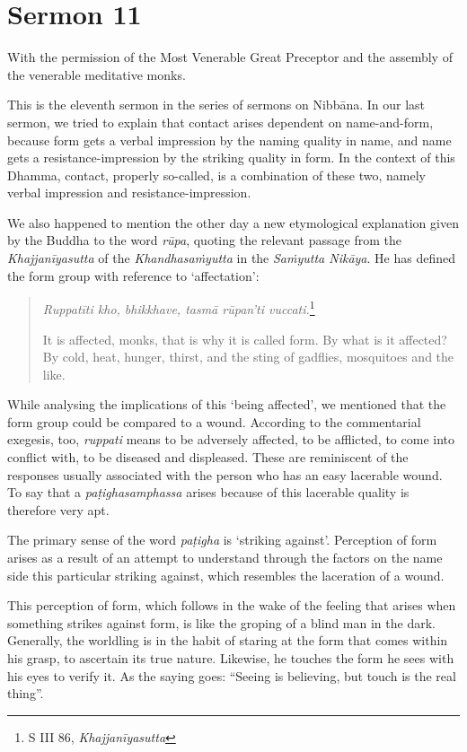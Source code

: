 \chapter{Sermon 11}

\NibbanaOpeningQuote

With the permission of the Most Venerable Great Preceptor and the assembly of the venerable meditative monks.

This is the eleventh sermon in the series of sermons on Nibbāna. In our last sermon, we tried to explain that contact arises dependent on name-and-form, because form gets a verbal impression by the naming quality in name, and name gets a resistance-impression by the striking quality in form. In the context of this Dhamma, contact, properly so-called, is a combination of these two, namely verbal impression and resistance-impression.

We also happened to mention the other day a new etymological explanation given by the Buddha to the word \emph{rūpa}, quoting the relevant passage from the \emph{Khajjanīyasutta} of the \emph{Khandhasaṁyutta} in the \emph{Saṁyutta Nikāya}. He has defined the form group with reference to `affectation':

\begin{quote}
\emph{Ruppatīti kho, bhikkhave, tasmā rūpan'ti vuccati.}\footnote{S III 86, \emph{Khajjanīyasutta}}

It is affected, monks, that is why it is called form. By what is it affected? By cold, heat, hunger, thirst, and the sting of gadflies, mosquitoes and the like.
\end{quote}

While analysing the implications of this `being affected', we mentioned that the form group could be compared to a wound. According to the commentarial exegesis, too, \emph{ruppati} means to be adversely affected, to be afflicted, to come into conflict with, to be diseased and displeased. These are reminiscent of the responses usually associated with the person who has an easy lacerable wound. To say that a \emph{paṭighasamphassa} arises because of this lacerable quality is therefore very apt.

The primary sense of the word \emph{paṭigha} is `striking against'. Perception of form arises as a result of an attempt to understand through the factors on the name side this particular striking against, which resembles the laceration of a wound.

This perception of form, which follows in the wake of the feeling that arises when something strikes against form, is like the groping of a blind man in the dark. Generally, the worldling is in the habit of staring at the form that comes within his grasp, to ascertain its true nature. Likewise, he touches the form he sees with his eyes to verify it. As the saying goes: ``Seeing is believing, but touch is the real thing''.

